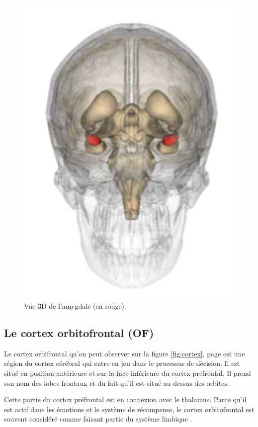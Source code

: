 \begin{figure}[th]
\centering
\includegraphics{Figures/2}
\decoRule
\caption[L'amygdale]{Vue 3D de l'amygdale (en rouge).}
\label{fig:amy}
\end{figure}


\subsection{Le cortex orbitofrontal (OF)}

Le cortex orbifrontal qu'on peut observer sur la figure \ref{fig:cortex}, page \pageref{fig:cortex} est une région du cortex cérébral qui entre en jeu dans le processus de décision. Il est situé en position antérieure et sur la face inférieure du cortex préfrontal. Il prend son nom des lobes frontaux et du fait qu'il est situé au-dessus des orbites.


Cette partie du cortex préfrontal est en connexion avec le thalamus. Parce qu'il est actif dans les émotions et le système de récompense, le cortex orbitofrontal est souvent considéré comme faisant partie du système limbique \parencite{cortex}.

